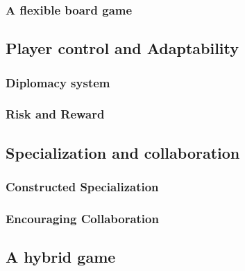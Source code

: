 \subsubsection{A flexible board game}
\subsection{Player control and Adaptability}
\subsubsection{Diplomacy system}
\subsubsection{Risk and Reward}
\subsection{Specialization and collaboration}
\subsubsection{Constructed Specialization}
\subsubsection{Encouraging Collaboration}
\subsection{A hybrid game}
